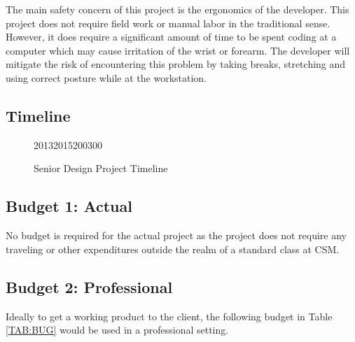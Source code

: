 \documentclass[12pt]{article}
\begin{document}
The main safety concern of this project is the ergonomics of the developer. This project does not require field work or manual labor in the traditional sense. However, it does require a significant amount of time to be spent coding at a computer which may cause irritation of the wrist or forearm. The developer will mitigate the risk of encountering this problem by taking breaks, stretching and using correct posture while at the workstation.

\subsection{Timeline}

\begin{figure}[H]

\begin{timeline}{2013}{2015}{200}{300}
  
  
\end{timeline}
\caption{Senior Design Project Timeline}
\end{figure}

\subsection{Budget 1: Actual}

No budget is required for the actual project as the project does not require any traveling or other expenditures outside the realm of a standard class at CSM.

\subsection{Budget 2: Professional}

Ideally to get a working product to the client, the following budget in Table \ref{TAB:BUG} would be used in a professional setting. 
\end{document}
